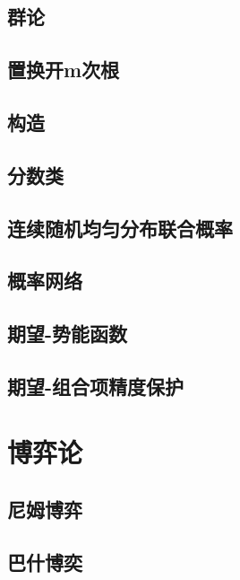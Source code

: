 \documentclass{article}
\begin{document}
\subsection{群论} 

\subsection{置换开m次根} 


\subsection{构造} 


\subsection{分数类} 

\subsection{连续随机均匀分布联合概率} 

\subsection{概率网络} 

\subsection{期望-势能函数} 

\subsection{期望-组合项精度保护} 



\newpage %
\section{博弈论} %
\subsection{尼姆博弈} 

\subsection{巴什博奕} 

\end{document}
